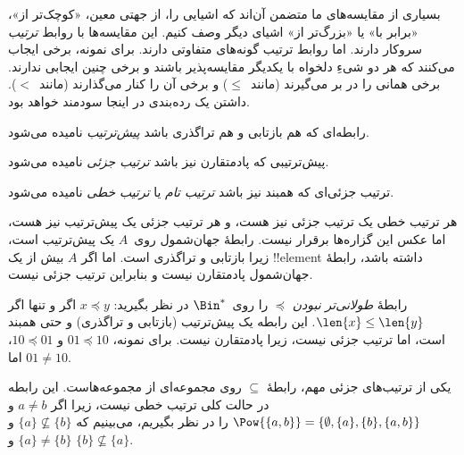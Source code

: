 \documentclass[../../../include/open-logic-section]{subfiles}
\begin{document}

\begin{explain}
بسیاری از مقایسه‌های ما متضمن آن‌اند که اشیایی را، از جهتی معین،
«کوچک‌تر از»، «برابر با» یا «بزرگ‌تر از» اشیای دیگر وصف کنیم. این
مقایسه‌ها با روابط \emph{ترتیب} سروکار دارند. اما روابط ترتیب گونه‌های
متفاوتی دارند. برای نمونه، برخی ایجاب می‌کنند که هر دو شیءِ دلخواه با
یکدیگر مقایسه‌پذیر باشند و برخی چنین ایجابی ندارند. برخی همانی را در بر می‌گیرند
(مانند~$\le$) و برخی آن را کنار می‌گذارند (مانند~$<$). داشتن یک
رده‌بندی در اینجا سودمند خواهد بود.
\end{explain}

\begin{defn}
رابطه‌ای که هم بازتابی و هم تراگذری باشد \emph{پیش‌ترتیب} نامیده
می‌شود.
\end{defn}

\begin{defn}
پیش‌ترتیبی که پادمتقارن نیز باشد \emph{ترتیب جزئی} نامیده می‌شود.
\end{defn}

\begin{defn}
ترتیب جزئی‌ای که همبند نیز باشد \emph{ترتیب تام} یا
\emph{ترتیب خطی} نامیده می‌شود.
\end{defn}

\begin{ex}
هر ترتیب خطی یک ترتیب جزئی نیز هست، و هر ترتیب جزئی یک پیش‌ترتیب نیز
هست، اما عکس این گزاره‌ها برقرار نیست. رابطهٔ جهان‌شمول روی~$A$ یک
پیش‌ترتیب است، زیرا بازتابی و تراگذری است. اما اگر $A$ بیش از یک
!!{element} داشته باشد، رابطهٔ جهان‌شمول پادمتقارن نیست و بنابراین
ترتیب جزئی نیست.
\end{ex}

\begin{ex}
رابطهٔ \emph{طولانی‌تر نبودن} $\preccurlyeq$ را روی~$\Bin^*$ در نظر
بگیرید: $x \preccurlyeq y$ اگر و تنها اگر $\len{x} \le \len{y}$. این
رابطه یک پیش‌ترتیب (بازتابی و تراگذری) و حتی همبند است، اما ترتیب جزئی
نیست، زیرا پادمتقارن نیست. برای نمونه، $01
\preccurlyeq 10$ و $10 \preccurlyeq 01$، اما $01 \neq 10$.
\end{ex}

\begin{ex}
یکی از ترتیب‌های جزئی مهم، رابطهٔ $\subseteq$ روی مجموعه‌ای از
مجموعه‌هاست. این رابطه در حالت کلی ترتیب خطی نیست، زیرا اگر $a \neq b$
و $\Pow{\{a, b\}} = \{\emptyset, \{a\}, \{b\}, \{a,b\}\}$ را در نظر
بگیریم، می‌بینیم که $\{a\} \nsubseteq \{b\}$ و
$\{a\} \neq \{b\}$ و $\{b\}
\nsubseteq \{a\}$.
\end{ex}
\end{document}
